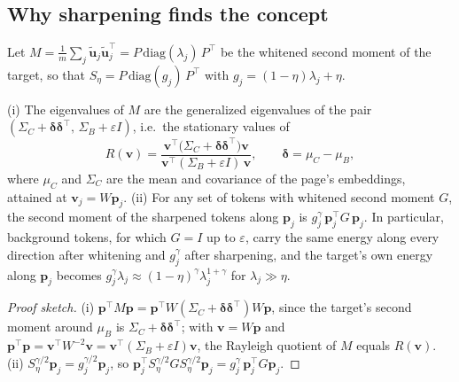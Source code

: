 \subsection{Why sharpening finds the concept}
\label{app:cs-why}

Let $M = \frac1m\sum_j \tilde{\mathbf u}_j\tilde{\mathbf u}_j^{\top} = P\,\mathrm{diag}(\lambda_j)\,P^{\top}$ be the whitened second moment of the target, so that $S_\eta = P\,\mathrm{diag}(g_j)\,P^{\top}$ with $g_j = (1-\eta)\lambda_j + \eta$.

\begin{proposition}
\label{prop:cs}
(i) The eigenvalues of $M$ are the generalized eigenvalues of the pair $(\Sigma_C + \bm\delta\bm\delta^{\top},\, \Sigma_B + \varepsilon I)$, i.e.\ the stationary values of
\begin{equation*}
  R(\mathbf{v}) = \frac{\mathbf v^{\top}\big(\Sigma_C + \bm\delta\bm\delta^{\top}\big)\mathbf v}{\mathbf v^{\top}(\Sigma_B + \varepsilon I)\,\mathbf v}, \qquad \bm\delta = \mu_C - \mu_B ,
\end{equation*}
where $\mu_C$ and $\Sigma_C$ are the mean and covariance of the page's embeddings, attained at $\mathbf v_j = W\mathbf p_j$.
(ii) For any set of tokens with whitened second moment $G$, the second moment of the sharpened tokens along $\mathbf p_j$ is $g_j^{\gamma}\,\mathbf p_j^{\top}G\,\mathbf p_j$.
In particular, background tokens, for which $G = I$ up to $\varepsilon$, carry the same energy along every direction after whitening and $g_j^{\gamma}$ after sharpening, and the target's own energy along $\mathbf p_j$ becomes $g_j^{\gamma}\lambda_j \approx (1-\eta)^{\gamma}\lambda_j^{1+\gamma}$ for $\lambda_j \gg \eta$.
\end{proposition}

\begin{proof}[Proof sketch]
(i) $\mathbf p^{\top}M\mathbf p = \mathbf p^{\top}W(\Sigma_C + \bm\delta\bm\delta^{\top})W\mathbf p$, since the target's second moment around $\mu_B$ is $\Sigma_C + \bm\delta\bm\delta^{\top}$; with $\mathbf v = W\mathbf p$ and $\mathbf p^{\top}\mathbf p = \mathbf v^{\top}W^{-2}\mathbf v = \mathbf v^{\top}(\Sigma_B + \varepsilon I)\mathbf v$, the Rayleigh quotient of $M$ equals $R(\mathbf v)$.
(ii) $S_\eta^{\gamma/2}\mathbf p_j = g_j^{\gamma/2}\mathbf p_j$, so $\mathbf p_j^{\top}S_\eta^{\gamma/2}GS_\eta^{\gamma/2}\mathbf p_j = g_j^{\gamma}\,\mathbf p_j^{\top}G\mathbf p_j$.
\end{proof}

